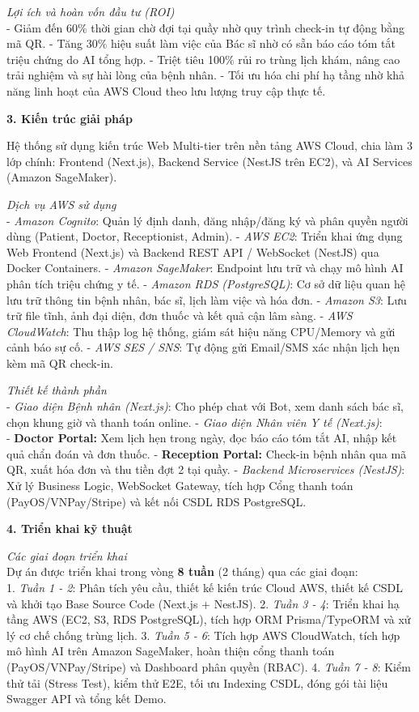 \emph{Lợi ích và hoàn vốn đầu tư (ROI)}\\
- Giảm đến 60\% thời gian chờ đợi tại quầy nhờ quy trình check-in tự
động bằng mã QR. - Tăng 30\% hiệu suất làm việc của Bác sĩ nhờ có sẵn
báo cáo tóm tắt triệu chứng do AI tổng hợp. - Triệt tiêu 100\% rủi ro
trùng lịch khám, nâng cao trải nghiệm và sự hài lòng của bệnh nhân. -
Tối ưu hóa chi phí hạ tầng nhờ khả năng linh hoạt của AWS Cloud theo lưu
lượng truy cập thực tế.

\vspace{0.5em}\noindent\textbf{3. Kiến trúc giải pháp}

Hệ thống sử dụng kiến trúc Web Multi-tier trên nền tảng AWS Cloud, chia
làm 3 lớp chính: Frontend (Next.js), Backend Service (NestJS trên EC2),
và AI Services (Amazon SageMaker).

\emph{Dịch vụ AWS sử dụng}\\
- \emph{Amazon Cognito}: Quản lý định danh, đăng nhập/đăng ký và phân
quyền người dùng (Patient, Doctor, Receptionist, Admin). - \emph{AWS
EC2}: Triển khai ứng dụng Web Frontend (Next.js) và Backend REST API /
WebSocket (NestJS) qua Docker Containers. - \emph{Amazon SageMaker}:
Endpoint lưu trữ và chạy mô hình AI phân tích triệu chứng y tế. -
\emph{Amazon RDS (PostgreSQL)}: Cơ sở dữ liệu quan hệ lưu trữ thông tin
bệnh nhân, bác sĩ, lịch làm việc và hóa đơn. - \emph{Amazon S3}: Lưu trữ
file tĩnh, ảnh đại diện, đơn thuốc và kết quả cận lâm sàng. - \emph{AWS
CloudWatch}: Thu thập log hệ thống, giám sát hiệu năng CPU/Memory và gửi
cảnh báo sự cố. - \emph{AWS SES / SNS}: Tự động gửi Email/SMS xác nhận
lịch hẹn kèm mã QR check-in.

\emph{Thiết kế thành phần}\\
- \emph{Giao diện Bệnh nhân (Next.js)}: Cho phép chat với Bot, xem danh
sách bác sĩ, chọn khung giờ và thanh toán online. - \emph{Giao diện Nhân
viên Y tế (Next.js)}:\\
- \textbf{Doctor Portal:} Xem lịch hẹn trong ngày, đọc báo cáo tóm tắt
AI, nhập kết quả chẩn đoán và đơn thuốc. - \textbf{Reception Portal:}
Check-in bệnh nhân qua mã QR, xuất hóa đơn và thu tiền đợt 2 tại quầy. -
\emph{Backend Microservices (NestJS)}: Xử lý Business Logic, WebSocket
Gateway, tích hợp Cổng thanh toán (PayOS/VNPay/Stripe) và kết nối CSDL
RDS PostgreSQL.

\vspace{0.5em}\noindent\textbf{4. Triển khai kỹ thuật}

\emph{Các giai đoạn triển khai}\\
Dự án được triển khai trong vòng \textbf{8 tuần} (2 tháng) qua các giai
đoạn:\\
1. \emph{Tuần 1 - 2}: Phân tích yêu cầu, thiết kế kiến trúc Cloud AWS,
thiết kế CSDL và khởi tạo Base Source Code (Next.js + NestJS). 2.
\emph{Tuần 3 - 4}: Triển khai hạ tầng AWS (EC2, S3, RDS PostgreSQL),
tích hợp ORM Prisma/TypeORM và xử lý cơ chế chống trùng lịch. 3.
\emph{Tuần 5 - 6}: Tích hợp AWS CloudWatch, tích hợp mô hình AI trên
Amazon SageMaker, hoàn thiện cổng thanh toán (PayOS/VNPay/Stripe) và
Dashboard phân quyền (RBAC). 4. \emph{Tuần 7 - 8}: Kiểm thử tải (Stress
Test), kiểm thử E2E, tối ưu Indexing CSDL, đóng gói tài liệu Swagger API
và tổng kết Demo.

